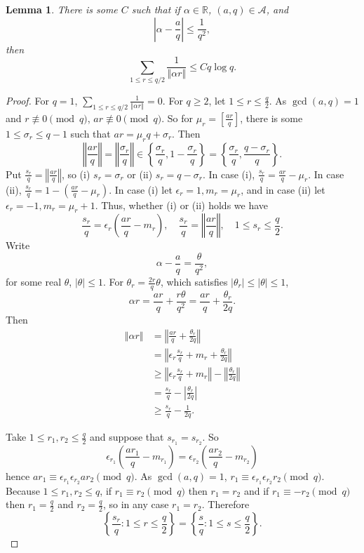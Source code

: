 \documentclass{article}
\newcommand{\norm}[1]{\left\Vert #1 \right\Vert}
\newtheorem{lemma}[theorem]{Lemma}
\begin{document}
\begin{lemma}
There is some $C$ such that if $\alpha \in \mathbb{R}$, $(a,q) \in \mathscr{A}$, and
\[
\left|\alpha - \frac{a}{q} \right| \leq \frac{1}{q^2},
\]
then
\[
\sum_{1 \leq r \leq q/2} \frac{1}{\norm{\alpha r}} \leq C q\log q.
\]
\label{lemma48}
\end{lemma}
\begin{proof}
For $q=1$, $\sum_{1 \leq r \leq q/2} \frac{1}{\norm{\alpha r}}=0$. For $q \geq 2$, let
$1 \leq r \leq \frac{q}{2}$. 
As $\gcd(a,q)=1$ and $r \not \equiv 0 \pmod{q}$, $ar \not \equiv 0 \pmod{q}$. So for $\mu_r = \left[ \frac{ar}{q} \right]$, there is some
$1 \leq \sigma_r \leq q-1$ such that $ar=\mu_r q + \sigma_r$. Then
\[
\norm{\frac{ar}{q}} = \norm{\frac{\sigma_r}{q}} \in \left\{ \frac{\sigma_r}{q},1-\frac{\sigma_r}{q}\right\}
=\left\{\frac{\sigma_r}{q},\frac{q-\sigma_r}{q}\right\}.
\]
Put $\frac{s_r}{q} =  \norm{\frac{ar}{q}}$, so (i) $s_r = \sigma_r$ or (ii) $s_r = q-\sigma_r$.
In case (i), $\frac{s_r}{q} = \frac{ar}{q}-\mu_r$.
In case (ii), $\frac{s_r}{q} = 1-\left( \frac{ar}{q} - \mu_r \right)$.
In case (i) let $\epsilon_r = 1, m_r=\mu_r$, and in case (ii) let $\epsilon_r=-1,
m_r = \mu_r+1$. Thus, whether (i) or (ii) holds we have
\[
\frac{s_r}{q} = \epsilon_r \left(\frac{ar}{q}-m_r\right),\quad \frac{s_r}{q} = \norm{\frac{ar}{q}}, \quad 1 \leq s_r \leq \frac{q}{2}.
\]
Write 
\[
\alpha - \frac{a}{q} = \frac{\theta}{q^2},
\]
for some real $\theta$, $|\theta| \leq 1$. For $\theta_r = \frac{2r}{q} \theta$, which satisfies
$|\theta_r| \leq |\theta| \leq 1$,
\[
\alpha r = \frac{ar}{q} + \frac{r\theta}{q^2} = \frac{ar}{q} + \frac{\theta_r}{2q}.
\]
Then
\begin{align*}
\norm{\alpha r}&=\norm{\frac{ar}{q}+\frac{\theta_r}{2q}}\\
&=\norm{\epsilon_r \frac{s_r}{q} + m_r + \frac{\theta_r}{2q}}\\
&\geq \norm{\epsilon_r \frac{s_r}{q} + m_r} - \norm{\frac{\theta_r}{2q}}\\
&=\frac{s_r}{q} - \left|\frac{\theta_r}{2q}\right|\\
&\geq \frac{s_r}{q} - \frac{1}{2q}.
\end{align*}

Take $1 \leq r_1, r_2 \leq \frac{q}{2}$ and suppose that $s_{r_1}=s_{r_2}$. So 
\[
 \epsilon_{r_1} \left(\frac{ar_1}{q}-m_{r_1}\right) =  \epsilon_{r_2} \left(\frac{ar_2}{q}-m_{r_2}\right)
\]
hence $ar_1 \equiv \epsilon_{r_1} \epsilon_{r_2} ar_2 \pmod{q}$.  As
$\gcd(a,q)=1$, $r_1 \equiv \epsilon_{r_1} \epsilon_{r_2} r_2 \pmod{q}$. 
Because $1 \leq r_1, r_2 \leq q$, 
if $r_1 \equiv r_2 \pmod{q}$ then $r_1=r_2$ and if $r_1 \equiv -r_2 \pmod{q}$ then $r_1 = \frac{q}{2}$
and $r_2=\frac{q}{2}$, so in any case $r_1=r_2$. 
Therefore
\[
\left\{ \frac{s_r}{q} : 1 \leq r \leq \frac{q}{2} \right\}
=\left\{\frac{s}{q} : 1 \leq s \leq \frac{q}{2} \right\}.
\]


\end{proof}
\end{document}
